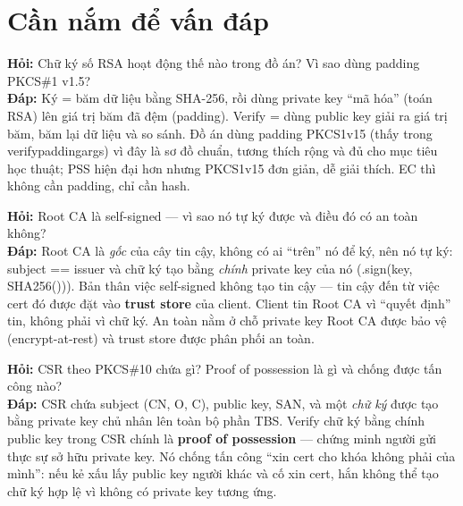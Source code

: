 \documentclass[12pt,a4paper]{article}
\newcommand{\code}[1]{{\ttfamily\small\def\_{\textunderscore\discretionary{}{}{}}#1}}
\begin{document}
\section{Cần nắm để vấn đáp}

\begin{qabox}
\textbf{Hỏi:} Chữ ký số RSA hoạt động thế nào trong đồ án? Vì sao dùng padding
PKCS\#1 v1.5?\\[2pt]
\textbf{Đáp:} Ký = băm dữ liệu bằng SHA-256, rồi dùng private key \enquote{mã
hóa} (toán RSA) lên giá trị băm đã đệm (padding). Verify = dùng public key giải
ra giá trị băm, băm lại dữ liệu và so sánh. Đồ án dùng padding \code{PKCS1v15}
(thấy trong \code{\_verify\_padding\_args}) vì đây là sơ đồ chuẩn, tương thích
rộng và đủ cho mục tiêu học thuật; PSS hiện đại hơn nhưng PKCS1v15 đơn giản, dễ
giải thích. EC thì không cần padding, chỉ cần hash.
\end{qabox}

\begin{qabox}
\textbf{Hỏi:} Root CA là self-signed — vì sao nó tự ký được và điều đó có an
toàn không?\\[2pt]
\textbf{Đáp:} Root CA là \emph{gốc} của cây tin cậy, không có ai \enquote{trên}
nó để ký, nên nó tự ký: \code{subject == issuer} và chữ ký tạo bằng \emph{chính}
private key của nó (\code{.sign(key, SHA256())}). Bản thân việc self-signed
không tạo tin cậy — tin cậy đến từ việc cert đó được đặt vào \textbf{trust
store} của client. Client tin Root CA vì \enquote{quyết định} tin, không phải vì
chữ ký. An toàn nằm ở chỗ private key Root CA được bảo vệ (encrypt-at-rest) và
trust store được phân phối an toàn.
\end{qabox}

\begin{qabox}
\textbf{Hỏi:} CSR theo PKCS\#10 chứa gì? Proof of possession là gì và chống được
tấn công nào?\\[2pt]
\textbf{Đáp:} CSR chứa subject (CN, O, C), public key, SAN, và một \emph{chữ
ký} được tạo bằng private key chủ nhân lên toàn bộ phần TBS. Verify chữ ký bằng
chính public key trong CSR chính là \textbf{proof of possession} — chứng minh
người gửi thực sự sở hữu private key. Nó chống tấn công \enquote{xin cert cho
khóa không phải của mình}: nếu kẻ xấu lấy public key người khác và cố xin cert,
hắn không thể tạo chữ ký hợp lệ vì không có private key tương ứng.
\end{qabox}
\end{document}
